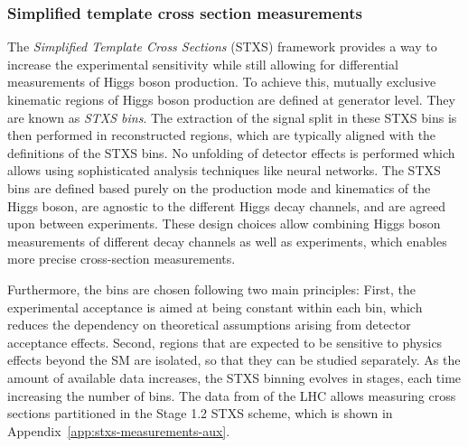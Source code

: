
\subsubsection{Simplified template cross section measurements}
The \emph{Simplified Template Cross Sections} (STXS) framework provides a way to increase the experimental sensitivity while still allowing for differential measurements of Higgs boson production.
To achieve this, mutually exclusive kinematic regions of Higgs boson production are defined at generator level. They are known as \emph{STXS bins}. 
The extraction of the signal split in these STXS bins is then performed in reconstructed regions, which are typically aligned with the definitions of the STXS bins. No unfolding of detector effects is performed which allows using sophisticated analysis techniques like neural networks.
The STXS bins are defined based purely on the production mode and kinematics of the Higgs boson, are agnostic to the different Higgs decay channels, and are agreed upon between experiments.
These design choices allow combining Higgs boson measurements of different decay channels as well as experiments, which enables more precise cross-section measurements.

Furthermore, the bins are chosen following two main principles: First, the experimental acceptance is aimed at being constant within each bin, which reduces the dependency on theoretical assumptions arising from detector acceptance effects. Second, regions that are expected to be sensitive to physics effects beyond the SM are isolated, so that they can be studied separately.
As the amount of available data increases, the STXS binning evolves in stages, each time increasing the number of bins. 
The data from \RunTwo of the LHC allows measuring cross sections partitioned in the Stage 1.2 STXS scheme, which is shown in Appendix~\ref{app:stxs-measurements-aux}.

